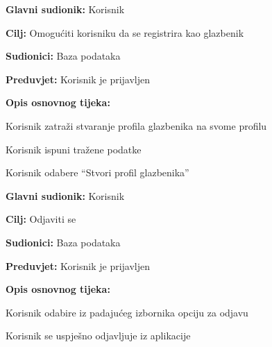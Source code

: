 			\noindent {}
			\begin{packed_item}
				
				\item \textbf{Glavni sudionik: } Korisnik
				\item  \textbf{Cilj:} Omogućiti korisniku da se registrira kao glazbenik 
				\item  \textbf{Sudionici:} Baza podataka
				\item  \textbf{Preduvjet:} Korisnik je prijavljen
				\item  \textbf{Opis osnovnog tijeka:} 
				
				\item[] \begin{packed_enum}
					
					\item Korisnik zatraži stvaranje profila glazbenika na svome profilu
					\item Korisnik ispuni tražene podatke
					\item Korisnik odabere “Stvori profil glazbenika”
			
				\end{packed_enum}
			\end{packed_item}	
		
		   \noindent \underbar{\textbf{UC18 - Odjava}}
		   \begin{packed_item}
		   	
		   	\item \textbf{Glavni sudionik: } Korisnik
		   	\item  \textbf{Cilj:} Odjaviti se
		   	\item  \textbf{Sudionici:} Baza podataka
		   	\item  \textbf{Preduvjet:} Korisnik je prijavljen
		   	\item  \textbf{Opis osnovnog tijeka:} 
		   	
		   	\item[] \begin{packed_enum}
		   		
		   		\item Korisnik odabire iz padajućeg izbornika opciju za odjavu
		   		\item Korisnik se uspješno odjavljuje iz aplikacije
		   		
		   	\end{packed_enum}
		   \end{packed_item}	 
	
